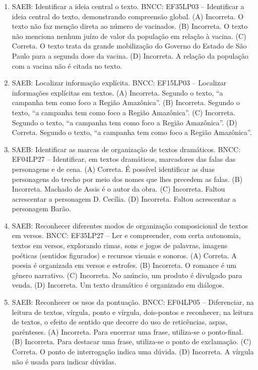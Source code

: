 \begin{enumerate}
\item
SAEB: Identificar a ideia central o texto. BNCC: EF35LP03 -- Identificar a ideia central do texto, demonstrando compreensão global. 
(A) Incorreta. O texto não faz menção direta ao número de vacinados.
(B) Incorreta. O texto não menciona nenhum juízo de valor da população em relação à vacina. 
(C) Correta. O texto trata da grande mobilização do Governo do Estado de São Paulo para a segunda dose da vacina. 
(D) Incorreta. A relação da população com a vacina não é citada no texto.

\item
SAEB: Localizar informação explícita. BNCC: EF15LP03 -- Localizar informações explícitas em textos. 
(A) Incorreta. Segundo o texto, ``a campanha tem como foco a Região Amazônica''. 
(B) Incorreta. Segundo o texto, ``a campanha tem como foco a Região Amazônica''. 
(C) Incorreta. Segundo o texto, ``a campanha tem como foco a Região Amazônica''. 
(D) Correta. Segundo o texto, ``a campanha tem como foco a Região Amazônica''.

\item
SAEB: Identificar as marcas de organização de textos dramáticos. BNCC: EF04LP27 -- Identificar, em textos dramáticos, marcadores das falas das personagens e de cena. 
(A) Correta. É possível identificar as duas personagens do trecho por meio dos nomes que lhes precedem as falas. 
(B) Incorreta. Machado de Assis é o autor da obra. 
(C) Incorreta. Faltou acrescentar a personagem D. Cecília. 
(D) Incorreta. Faltou acrescentar a personagem Barão.

\item
SAEB: Reconhecer diferentes modos de organização composicional de textos em versos. BNCC: EF35LP27 -- Ler e compreender, com certa autonomia, textos em versos, explorando rimas, sons e jogos de palavras, imagens poéticas (sentidos figurados) e recursos visuais e sonoros. 
(A) Correta. A poesia é organizada em versos e estrofes. 
(B) Incorreta. O romance é um gênero narrativo. 
(C) Incorreta. No anúncio, um produto é divulgado para venda. 
(D) Incorreta. Um texto dramático é organizado em diálogos.

\item
SAEB: Reconhecer os usos da pontuação. BNCC: EF04LP05 -- Diferenciar, na leitura de textos, vírgula, ponto e vírgula, dois-pontos e reconhecer, na leitura de textos, o efeito de sentido que decorre do uso de reticências, aspas, parênteses. 
(A) Incorreta. Para encerrar uma frase, utiliza-se o ponto-final. 
(B) Incorreta. Para destacar uma frase, utiliza-se o ponto de exclamação. 
(C) Correta. O ponto de interrogação indica uma dúvida. 
(D) Incorreta. A vírgula não é usada para indicar dúvidas.


\end{enumerate}
